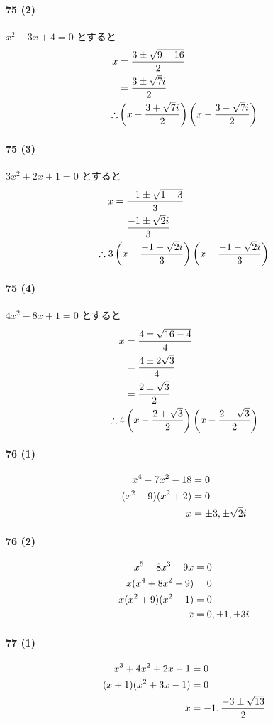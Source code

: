\documentclass[fleqn,a4j,dvipdfmx,uplatex,twocolumn]{jsarticle}
\def\nr{\notag\\}%
\begin{document}
\paragraph{75 (2)}
$x^2 - 3x + 4 = 0$ とすると 
\begin{align*}
  x &= \frac{3 \pm \sqrt{9 - 16}}{2} \nr
  &= \frac{3 \pm \sqrt{7}i}{2} \nr
  \therefore &\left(x - \frac{3 + \sqrt{7}i}{2}\right)\left(x - \frac{3 - \sqrt{7}i}{2}\right) 
\end{align*}

\paragraph{75 (3)}
$3x^2 + 2x + 1 = 0$ とすると 
\begin{align*}
  x &= \frac{-1 \pm \sqrt{1 - 3}}{3} \nr
  &= \frac{-1 \pm \sqrt{2}i}{3} \nr
  \therefore 3&\left(x - \frac{-1 + \sqrt{2}i}{3}\right)\left(x - \frac{-1 - \sqrt{2}i}{3}\right) 
\end{align*}

\paragraph{75 (4)}
$4x^2 - 8x + 1 = 0$ とすると 
\begin{align*}
  x &= \frac{4 \pm \sqrt{16 - 4}}{4} \nr
  &= \frac{4 \pm 2\sqrt{3}}{4} \nr
  &= \frac{2 \pm \sqrt{3}}{2} \nr
  \therefore 4&\left(x - \frac{2 + \sqrt{3}}{2}\right)\left(x - \frac{2 - \sqrt{3}}{2}\right) 
\end{align*}

\paragraph{76 (1)}
\begin{align*}
  x^4 - 7x^2 - 18 &= 0 \nr
  (x^2 - 9)(x^2 + 2) &= 0 \nr
  x &= \pm 3, \pm \sqrt{2}i 
\end{align*}

\paragraph{76 (2)}
\begin{align*}
  x^5 + 8x^3 - 9x &= 0 \nr
  x(x^4 + 8x^2 - 9) &= 0 \nr
  x(x^2 + 9)(x^2 - 1) &= 0 \nr
  x &= 0, \pm 1, \pm 3i 
\end{align*}

\paragraph{77 (1)}
\begin{align*}
  x^3 + 4x^2 + 2x - 1 &= 0 \nr
  (x + 1)(x^2 + 3x - 1) &= 0 \nr
  x &= -1, \frac{-3 \pm \sqrt{13}}{2} 
\end{align*}
\end{document}
